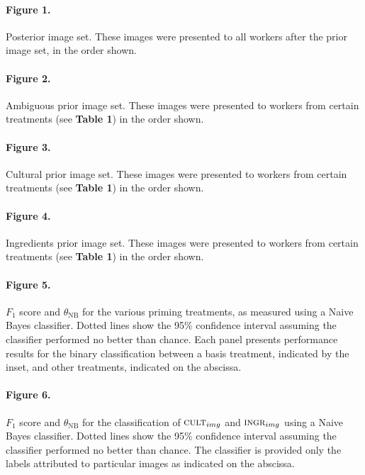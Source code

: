 \documentclass[a4paper]{report}
\begin{document}
\paragraph{Figure 1.}
	Posterior image set. These images were presented to all workers after the 
	prior image set, in the order shown. 

\paragraph{Figure 2.}
	Ambiguous prior image set. These images were presented to workers from 
	certain treatments (see \textbf{Table 1}) in the order shown.  

\paragraph{Figure 3.}
	Cultural prior image set. These images were presented to workers from 
	certain treatments (see \textbf{Table 1}) in the order shown.  

\paragraph{Figure 4.}
	Ingredients prior image set. These images were presented to workers from 
	certain treatments (see \textbf{Table 1}) in the order shown.  

\paragraph{Figure 5.}
$F_1$ score and $\theta_\text{NB}$ for the various 
priming treatments, as measured using a Naive Bayes classifier. Dotted lines 
show the 95\% confidence interval
assuming the classifier performed no better than chance.  Each panel 
presents performance results for the binary classification between a basis 
treatment, indicated by the inset, and other treatments, indicated on the 
abscissa.

\paragraph{Figure 6.}
$F_1$ score and $\theta_\text{NB}$ for the classification of 
$\textsc{cult}_{img}$ and $\textsc{ingr}_{img}$ using a Naive Bayes 
classifier.  Dotted lines 
show the 95\% confidence interval
assuming the classifier performed no better than chance.  The classifier is provided only the labels attributed to
particular images as indicated on the abscissa.
\end{document}
